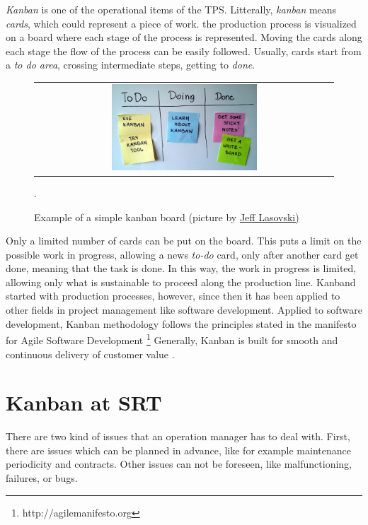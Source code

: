 \documentclass[a4paper]{spie}  %
\begin{document}
\textit{Kanban} is one of the operational items of the TPS. Litterally, {\it kanban} means {\it cards}, which could represent  a piece of work. the production process is visualized  on a board where each stage of the process is represented. Moving the cards along each stage the flow of the process can be easily followed. 
Usually, cards start from a {\it to do area}, crossing intermediate steps, getting to  {\it done}.
\begin{figure} [ht]
   \begin{center}
   \begin{tabular}{c} 
   \includegraphics[width=0.5\textwidth]{1200px-Simple-kanban-board-.jpg}
	\end{tabular}
	\end{center}
   \caption[example] 
   { \label{fig:kanban} Example of a simple kanban board (picture  by  \href{https://commons.wikimedia.org/wiki/File:Simple-kanban-board-.jpg}{Jeff Lasovski)}
 }.
   \end{figure} 
 Only a limited number of cards can be put on the board. This puts a limit on the possible work in progress, allowing a news {\it to-do} card, only
 after another card get {done}, meaning that the task is done. In this way, the work in progress is limited, allowing only what is sustainable to proceed along the production line.
 Kanband  started with production processes, however, since then it has been applied to other fields in project management  like software development. 
Applied to software development, Kanban methodology follows the principles stated in the manifesto for Agile Software Development
\footnote{http://agilemanifesto.org}   Generally,  Kanban is built for smooth and continuous delivery of customer value .


\section{Kanban at SRT}
There are two kind of issues that an operation manager has to deal with. First, there are issues which can be planned  in advance, like for example  maintenance periodicity and contracts. 
Other issues can not be foreseen, like malfunctioning, failures, or bugs.
\end{document}
